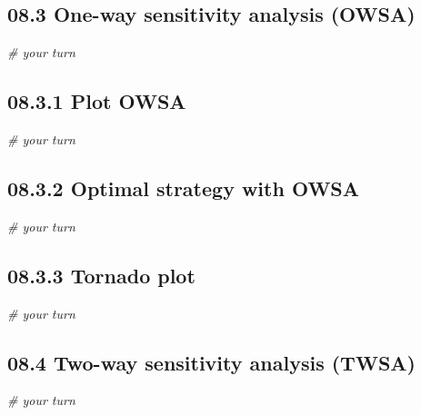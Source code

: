 \documentclass[]{article}
\newenvironment{Shaded}{\begin{snugshade}}{\end{snugshade}}
\newcommand{\CommentTok}[1]{\textcolor[rgb]{0.56,0.35,0.01}{\textit{#1}}}
\begin{document}
\subsection{08.3 One-way sensitivity analysis
(OWSA)}\label{one-way-sensitivity-analysis-owsa}

\begin{Shaded}
\begin{Highlighting}[]
\CommentTok{# your turn}
\end{Highlighting}
\end{Shaded}

\subsection{08.3.1 Plot OWSA}\label{plot-owsa}

\begin{Shaded}
\begin{Highlighting}[]
\CommentTok{# your turn}
\end{Highlighting}
\end{Shaded}

\subsection{08.3.2 Optimal strategy with
OWSA}\label{optimal-strategy-with-owsa}

\begin{Shaded}
\begin{Highlighting}[]
\CommentTok{# your turn}
\end{Highlighting}
\end{Shaded}

\subsection{08.3.3 Tornado plot}\label{tornado-plot}

\begin{Shaded}
\begin{Highlighting}[]
\CommentTok{# your turn}
\end{Highlighting}
\end{Shaded}

\subsection{08.4 Two-way sensitivity analysis
(TWSA)}\label{two-way-sensitivity-analysis-twsa}

\begin{Shaded}
\begin{Highlighting}[]
\CommentTok{# your turn}
\end{Highlighting}
\end{Shaded}
\end{document}
